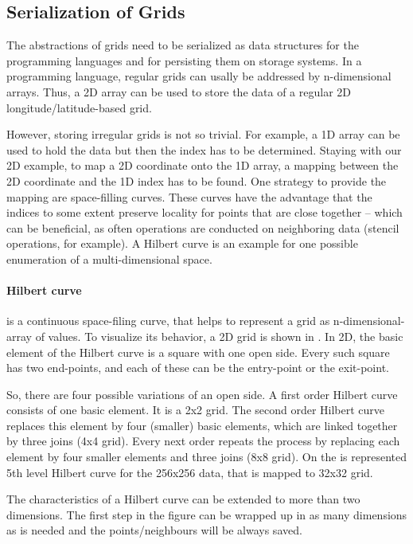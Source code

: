 \documentclass{../../template/esiwace-report}
\begin{document}
\subsection{Serialization of Grids}
The abstractions of grids need to be serialized as data structures for the programming languages and for persisting them on storage systems.
In a programming language, regular grids can usally be addressed by n-dimensional arrays.
Thus, a 2D array can be used to store the data of a regular 2D longitude/latitude-based grid.

However, storing irregular grids is not so trivial.
For example, a 1D array can be used to hold the data but then the index has to be determined.
Staying with our 2D example, to map a 2D coordinate onto the 1D array, a mapping between the 2D coordinate and the 1D index has to be found.
One strategy to provide the mapping are space-filling curves.
These curves have the advantage that the indices to some extent preserve locality for points that are  close together -- which can be beneficial, as often operations are conducted on neighboring data (stencil operations, for example).
A Hilbert curve is an example for one possible enumeration of a multi-dimensional space.

\paragraph{Hilbert curve}
is a continuous space-filing curve, that helps to represent a grid as n-dimensional-array of values.
To visualize its behavior, a 2D grid is shown in .
In 2D, the basic element of the Hilbert curve is a square with one open side.
Every such square has two end-points, and each of these can be the entry-point or the exit-point. 

So, there are four possible variations of an open side.
A first order Hilbert curve consists of one basic element.
It is a 2x2 grid.
The second order Hilbert curve replaces this element by four (smaller) basic elements, which are linked together by three joins (4x4 grid). 
Every next order repeats the process by replacing each element by four smaller elements and three joins (8x8 grid). 
On the  is represented 5th level Hilbert curve for the 256x256 data, that is mapped to 32x32 grid.

The characteristics of a Hilbert curve can be extended to more than two dimensions. 
The first step in the figure can be wrapped up in as many dimensions as is needed and the points/neighbours will be always saved.
\end{document}
